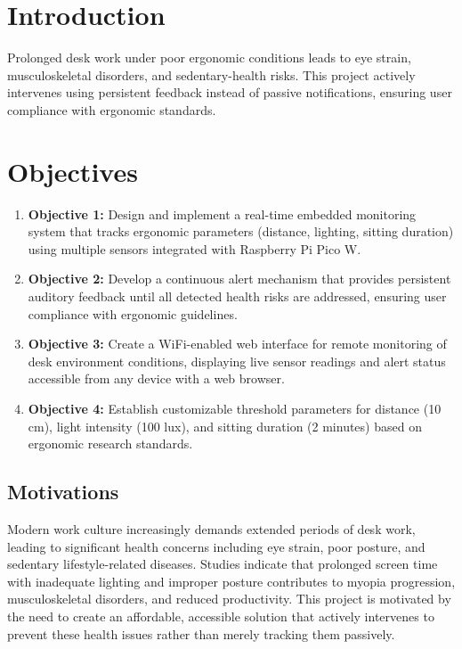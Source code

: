 \documentclass[12pt,a4paper]{article}
\begin{document}
\section{Introduction}

Prolonged desk work under poor ergonomic conditions leads to eye strain, musculoskeletal disorders, and sedentary-health risks. This project actively intervenes using persistent feedback instead of passive notifications, ensuring user compliance with ergonomic standards.

\section{Objectives}

\begin{enumerate}
\item \textbf{Objective 1:} Design and implement a real-time embedded monitoring system that tracks ergonomic parameters (distance, lighting, sitting duration) using multiple sensors integrated with Raspberry Pi Pico W.

\item \textbf{Objective 2:} Develop a continuous alert mechanism that provides persistent auditory feedback until all detected health risks are addressed, ensuring user compliance with ergonomic guidelines.

\item \textbf{Objective 3:} Create a WiFi-enabled web interface for remote monitoring of desk environment conditions, displaying live sensor readings and alert status accessible from any device with a web browser.

\item \textbf{Objective 4:} Establish customizable threshold parameters for distance (10 cm), light intensity (100 lux), and sitting duration (2 minutes) based on ergonomic research standards.
\end{enumerate}

\subsection{Motivations}

Modern work culture increasingly demands extended periods of desk work, leading to significant health concerns including eye strain, poor posture, and sedentary lifestyle-related diseases. Studies indicate that prolonged screen time with inadequate lighting and improper posture contributes to myopia progression, musculoskeletal disorders, and reduced productivity. This project is motivated by the need to create an affordable, accessible solution that actively intervenes to prevent these health issues rather than merely tracking them passively.
\end{document}
